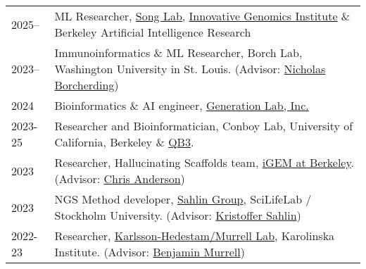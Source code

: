 \begin{longtable}[l]{@{}p{} p{}}

    2025-- & ML Researcher, \href{https://people.eecs.berkeley.edu/~yss/}{Song Lab}, \href{https://innovativegenomics.org/people/yun-s-song/}{Innovative Genomics Institute} \& Berkeley Artificial Intelligence Research \\

    2023-- & Immunoinformatics \& ML Researcher, Borch Lab, Washington University in St. Louis. (Advisor: \href{https://www.borch.dev/}{Nicholas Borcherding}) \\

    2024 & Bioinformatics \& AI engineer, \href{https://www.generationlab.com/}{Generation Lab, Inc.} \\

    2023-25 & Researcher and Bioinformatician, Conboy Lab, University of California, Berkeley \& \href{https://qb3.berkeley.edu/}{QB3}. \\

    2023 & Researcher, Hallucinating Scaffolds team, \href{https://igem.studentorg.berkeley.edu/teams/hallucinating-scaffolds/}{iGEM at Berkeley}. (Advisor: \href{https://vcresearch.berkeley.edu/faculty/chris-anderson}{Chris Anderson}) \\

    2023 & NGS Method developer, \href{https://sahlingroup.github.io/}{Sahlin Group}, SciLifeLab / Stockholm University. (Advisor: \href{https://www.scilifelab.se/researchers/kristoffer-sahlin/}{Kristoffer Sahlin}) \\

    2022-23 & Researcher, \href{https://ki.se/en/people/benjamin-murrell}{Karlsson-Hedestam/Murrell Lab}, Karolinska Institute. (Advisor: \href{https://ki.se/en/people/benjamin-murrell}{Benjamin Murrell})

\end{longtable}
